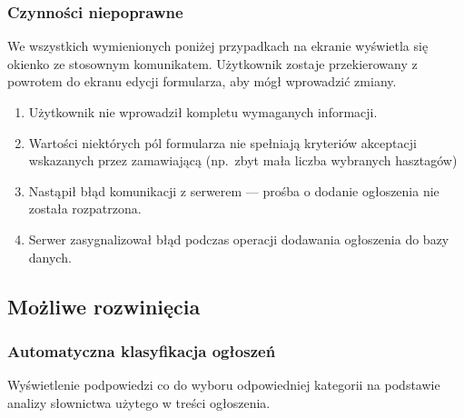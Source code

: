 \documentclass[licencjacka]{pracamgr}
\begin{document}
    \subsubsection{Czynności niepoprawne}
    We wszystkich wymienionych poniżej przypadkach na ekranie wyświetla się okienko ze stosownym komunikatem. Użytkownik zostaje przekierowany z powrotem do ekranu edycji formularza, aby mógł wprowadzić zmiany.
    \begin{enumerate}
        \item Użytkownik nie wprowadził kompletu wymaganych informacji.
        \item Wartości niektórych pól formularza nie spełniają kryteriów akceptacji wskazanych przez zamawiającą (np.\ zbyt mała liczba wybranych hasztagów)
        \item Nastąpił błąd komunikacji z serwerem --- prośba o dodanie ogłoszenia nie została rozpatrzona.
        \item Serwer zasygnalizował błąd podczas operacji dodawania ogłoszenia do bazy danych.
    \end{enumerate}
    \subsection{Możliwe rozwinięcia}
    \subsubsection{Automatyczna klasyfikacja ogłoszeń}
    Wyświetlenie podpowiedzi co do wyboru odpowiedniej kategorii na podstawie analizy słownictwa użytego w treści ogłoszenia.
\end{document}
